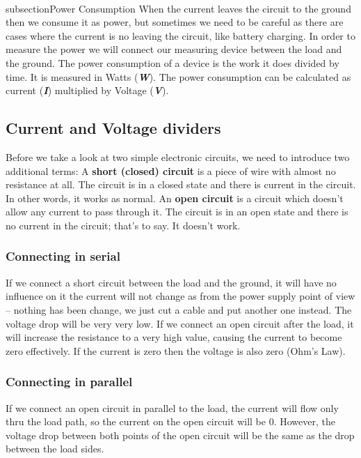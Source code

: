 \\subsection{Power Consumption}
When the current leaves the circuit to the ground then we consume it as power, but sometimes we need to be careful as there are cases where the current is no leaving the circuit, like battery charging. In order to measure the power we will connect our measuring device between the load and the ground.
The power consumption of a device is the work it does divided by time. It is measured in Watts (\textbf{\textit{W}}).
The power consumption can be calculated as current (\textbf{\textit{I}}) multiplied by Voltage (\textbf{\textit{V}}).
\subsection{Current and Voltage dividers}
Before we take a look at two simple electronic circuits, we need to introduce two additional terms:
A \textbf{short (closed) circuit} is a piece of wire with almost no resistance at all. The circuit is in a closed state and there is current in the circuit. In other words, it works as normal.
An \textbf{open circuit} is a circuit which doesn't allow any current to pass through it. The circuit is in an open state and there is no current in the circuit; that’s to say. It doesn’t work.
\subsubsection{Connecting in serial}
If we connect a short circuit between the load and the ground, it will have no influence on it the current will not change as from the power supply point of view – nothing has been change, we just cut a cable and put another one instead. The voltage drop will be very very low.
If we connect an open circuit after the load, it will increase the resistance to a very high value, causing the current to become zero effectively. If the current is zero then the voltage is also zero (Ohm’s Law).
\subsubsection{Connecting in parallel}
If we connect an open circuit in parallel to the load, the current will flow only thru the load path, so the current on the open circuit will be 0. However, the voltage drop between both points of the open circuit will be the same as the drop between the load sides.

